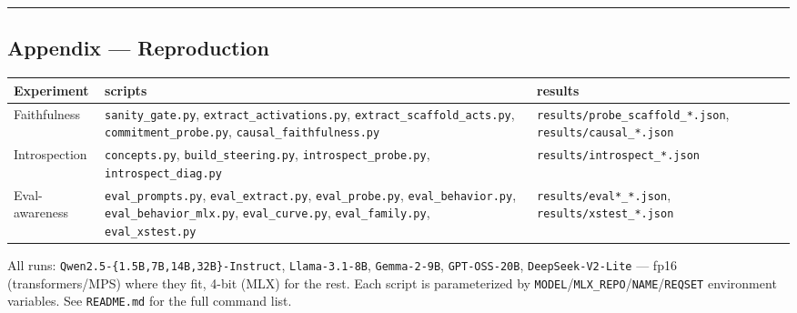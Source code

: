 \documentclass[
]{article}
\begin{document}
\begin{center}\rule{0.5\linewidth}{0.5pt}\end{center}

\subsection{Appendix --- Reproduction}\label{appendix-reproduction}

\begin{longtable}[]{@{}
  >{\raggedright\arraybackslash}p{}
  >{\raggedright\arraybackslash}p{}
  >{\raggedright\arraybackslash}p{}@{}}
\toprule\noalign{}
\begin{minipage}[b]{\linewidth}\raggedright
Experiment
\end{minipage} & \begin{minipage}[b]{\linewidth}\raggedright
scripts
\end{minipage} & \begin{minipage}[b]{\linewidth}\raggedright
results
\end{minipage} \\
\midrule\noalign{}
\endhead
\bottomrule\noalign{}
\endlastfoot
Faithfulness & \texttt{sanity\_gate.py},
\texttt{extract\_activations.py}, \texttt{extract\_scaffold\_acts.py},
\texttt{commitment\_probe.py}, \texttt{causal\_faithfulness.py} &
\texttt{results/probe\_scaffold\_*.json},
\texttt{results/causal\_*.json} \\
Introspection & \texttt{concepts.py}, \texttt{build\_steering.py},
\texttt{introspect\_probe.py}, \texttt{introspect\_diag.py} &
\texttt{results/introspect\_*.json} \\
Eval-awareness & \texttt{eval\_prompts.py}, \texttt{eval\_extract.py},
\texttt{eval\_probe.py}, \texttt{eval\_behavior.py},
\texttt{eval\_behavior\_mlx.py}, \texttt{eval\_curve.py},
\texttt{eval\_family.py}, \texttt{eval\_xstest.py} &
\texttt{results/eval*\_*.json}, \texttt{results/xstest\_*.json} \\
\end{longtable}

All runs: \texttt{Qwen2.5-\{1.5B,7B,14B,32B\}-Instruct},
\texttt{Llama-3.1-8B}, \texttt{Gemma-2-9B}, \texttt{GPT-OSS-20B},
\texttt{DeepSeek-V2-Lite} --- fp16 (transformers/MPS) where they fit,
4-bit (MLX) for the rest. Each script is parameterized by
\texttt{MODEL}/\texttt{MLX\_REPO}/\texttt{NAME}/\texttt{REQSET}
environment variables. See \texttt{README.md} for the full command list.
\end{document}

